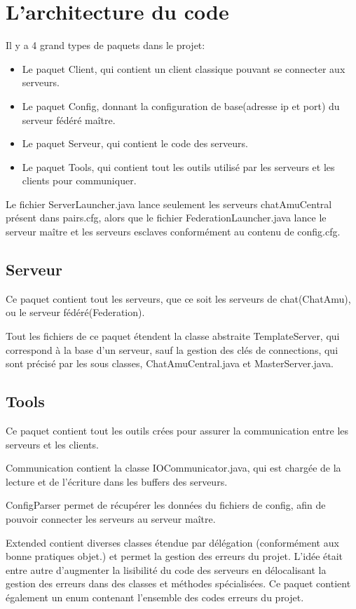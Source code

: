 \section{L'architecture du code}
Il y a 4 grand types de paquets dans le projet:
\begin{itemize}
    \item Le paquet Client, qui contient un client classique pouvant se connecter aux serveurs.
    \item Le paquet Config, donnant la configuration de base(adresse ip et port) du serveur fédéré maître.
    \item Le paquet Serveur, qui contient le code des serveurs.
    \item Le paquet Tools, qui contient tout les outils utilisé par les serveurs et les clients pour communiquer.
\end{itemize}

Le fichier ServerLauncher.java lance seulement les serveurs chatAmuCentral présent dans pairs.cfg, alors que le fichier FederationLauncher.java lance le serveur maître et les serveurs esclaves conformément au contenu de config.cfg.

\subsection{Serveur}
Ce paquet contient tout les serveurs, que ce soit les serveurs de chat(ChatAmu), ou le serveur fédéré(Federation).

Tout les fichiers de ce paquet étendent la classe abstraite TemplateServer, qui correspond à la base d'un serveur, sauf la gestion des clés de connections, qui sont précisé par les sous classes, ChatAmuCentral.java et MasterServer.java.

\subsection{Tools}
Ce paquet contient tout les outils crées pour assurer la communication entre les serveurs et les clients.

Communication contient la classe IOCommunicator.java, qui est chargée de la lecture et de l'écriture dans les buffers des serveurs.

ConfigParser permet de récupérer les données du fichiers de config, afin de pouvoir connecter les serveurs au serveur maître.

Extended contient diverses classes étendue par délégation (conformément aux bonne pratiques objet.) et permet la gestion des erreurs du projet. L'idée était entre autre d'augmenter la lisibilité du code des serveurs en délocalisant la gestion des erreurs dans des classes et méthodes spécialisées.
Ce paquet contient également un enum contenant l'ensemble des codes erreurs du projet.

